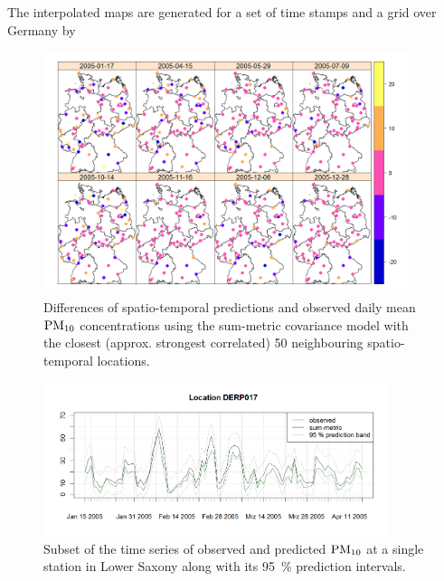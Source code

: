 The interpolated maps are generated for a set of time stamps  and a grid over Germany  by


\begin{figure}[t!]
\centering
\includegraphics[width=0.95\textwidth]{diffs_daily_means_PM10.png}
\caption{Differences of spatio-temporal predictions and observed daily mean $\rm{PM}_{10}$ concentrations using the sum-metric covariance model with the closest (approx. strongest correlated) 50 neighbouring spatio-temporal locations.}\label{fig:diffs_daily}
\end{figure}

\begin{figure}[h!]
\centering
\includegraphics[width=0.9\textwidth]{singleStationTimeSeries.png}
\caption{Subset of the time series of observed and predicted ${\rm PM}_{10}$ at a single station in Lower Saxony along with its 95~\% prediction intervals.}\label{fig:timeseries}
\end{figure}

